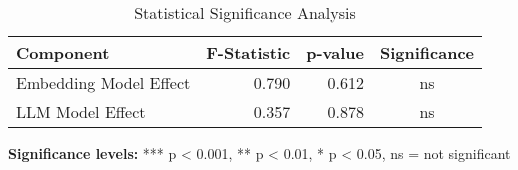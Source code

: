 \begin{table}
\caption{Statistical Significance Analysis}
\label{tab:statistical_significance}
\begin{tabular}{lrrc}
\toprule
Component & F-Statistic & p-value & Significance \\
\midrule
Embedding Model Effect & 0.790 & 0.612 & ns \\
LLM Model Effect & 0.357 & 0.878 & ns \\
\bottomrule
\end{tabular}
\end{table}

\textbf{Significance levels:} *** p < 0.001, ** p < 0.01, * p < 0.05, ns = not significant